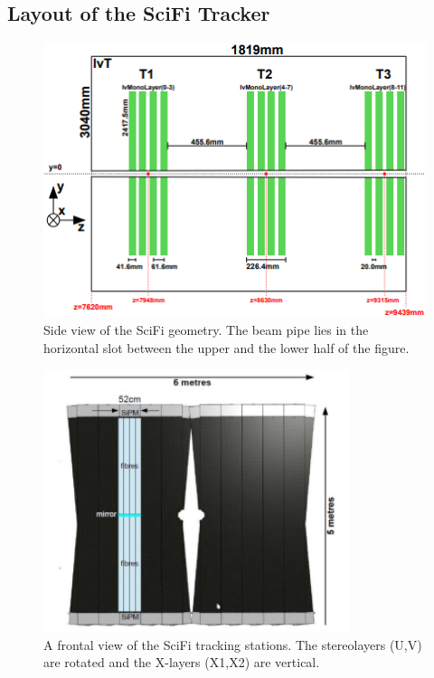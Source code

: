 \subsection{Layout of the SciFi Tracker}

\begin{figure}
  \centering
  \includegraphics{plots/scifi_layers.png}
  \caption{Side view of the SciFi geometry. The beam pipe lies in the horizontal slot between the upper and the lower half of the figure.\cite{scifiInfo}}
  \label{fig:scifi}
\end{figure}

\begin{figure}
  \centering
  \includegraphics[width=0.8\textwidth]{plots/scifi_frontview.png}
  \caption{A frontal view of the SciFi tracking stations. The stereolayers (U,V) are rotated and the X-layers (X1,X2) are vertical.}
  \label{fig:scifront}
\end{figure}

